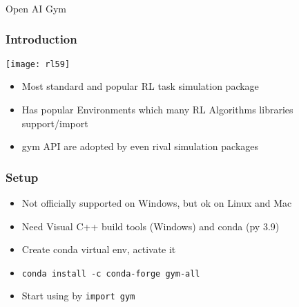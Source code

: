 \begin{frame}[fragile]\frametitle{}
\begin{center}
{\Large Open AI Gym}
\end{center}
\end{frame}

\begin{frame}[fragile]\frametitle{Introduction}

\begin{center}
\texttt{[image: rl59]}
\end{center}

\begin{itemize}
\item Most standard and popular RL task simulation package
\item Has popular Environments which many RL Algorithms libraries support/import
\item gym API are adopted by even rival simulation packages
\end{itemize}

\end{frame}

\begin{frame}[fragile]\frametitle{Setup}

\begin{itemize}
\item Not officially supported on Windows, but ok on Linux and Mac
\item Need Visual C++ build tools (Windows) and conda (py 3.9)
\item Create conda virtual env, activate it
\item \lstinline|conda install -c conda-forge gym-all|
\item Start using by \lstinline|import gym|
\end{itemize}

\end{frame}


